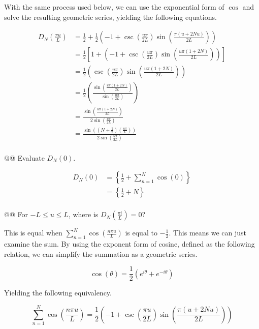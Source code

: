 \documentclass[10pt]{article}
\begin{document}
\begin{easylist}[enumerate]
    With the same process used below, we can use the exponential form of $\cos$ and solve the resulting geometric
    series, yielding the following equations.

    \begin{align*}
        D_N \left( \frac{\pi u}{L} \right) &= \frac{1}{2} + \frac{1}{2}
            \left( -1 + \csc\left(\frac{u\pi}{2L}\right)\sin\left(\frac{\pi(u+2Nu)}{2L}\right)\right)\\
        &= \frac{1}{2}\left[1+\left(-1+\csc\left(\frac{u\pi}{2L}\right)\sin\left(\frac{u\pi(1+2N)}{2L}\right)\right)\right]\\
        &= \frac{1}{2}\left(\csc\left(\frac{u\pi}{2L}\right)\sin\left(\frac{u\pi(1+2N)}{2L}\right)\right)\\
        &= \frac{1}{2}\left(\frac{\sin\left(\frac{u\pi(1+2N)}{2L}\right)}{\sin\left(\frac{u\pi}{2L}\right)}\right)\\
        &= \frac{\sin\left(\frac{u\pi(1+2N)}{2L}\right)}{2\sin\left(\frac{u\pi}{2L}\right)}\\
        &= \frac{\sin\left(\left(N+\frac{1}{2}\right)\left(\frac{u\pi}{L}\right)\right)}{2\sin\left(\frac{u\pi}{2L}\right)}\\
    \end{align*}

    @@ Evaluate $D_N(0)$.

    \begin{align*}
        D_N (0) &= \left\{ \frac{1}{2} + \sum_{n=1}^N \cos (0) \right\}\\
            &= \left\{ \frac{1}{2} + N \right\}\\
    \end{align*}

    @@ For $-L \le u \le L$, where is $D_N \left( \frac{ \pi i }{L} \right) = 0$?

    This is equal when $\sum_{n=1}^N \cos \left( \frac{n \pi u}{L} \right)$ is equal to $-\frac{1}{2}$. This means we
    can just examine the sum. By using the exponent form of cosine, defined as the following relation, we can simplify
    the summation as a geometric series.

    \[
        \cos(\theta) = \frac{1}{2} \left( e^{i \theta} + e^{-i \theta} \right)
    \]

    Yielding the following equivalency.

    \[
        \sum_{n=1}^N \cos \left( \frac{n \pi u}{L} \right) = \frac{1}{2}
        \left( -1 + \csc\left( \frac{\pi u}{2L} \right) \sin\left( \frac{\pi (u + 2Nu)}{2L}\right)\right)
    \]


\end{easylist}
\end{document}
